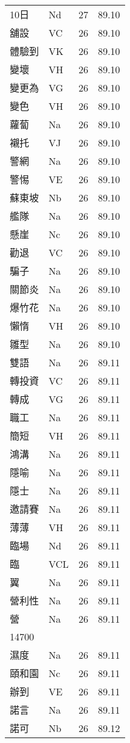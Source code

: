 \documentclass[twocolumn]{book}
\begin{document}
\begin{supertabular}{llrr}
10日 & Nd & 27 &  89.10\\
舖設 & VC & 26 &  89.10\\
體驗到 & VK & 26 &  89.10\\
變壞 & VH & 26 &  89.10\\
變更為 & VG & 26 &  89.10\\
變色 & VH & 26 &  89.10\\
蘿蔔 & Na & 26 &  89.10\\
襯托 & VJ & 26 &  89.10\\
警網 & Na & 26 &  89.10\\
警惕 & VE & 26 &  89.10\\
蘇東坡 & Nb & 26 &  89.10\\
艦隊 & Na & 26 &  89.10\\
懸崖 & Nc & 26 &  89.10\\
勸退 & VC & 26 &  89.10\\
騙子 & Na & 26 &  89.10\\
關節炎 & Na & 26 &  89.10\\
爆竹花 & Na & 26 &  89.10\\
懶惰 & VH & 26 &  89.10\\
雛型 & Na & 26 &  89.10\\
雙語 & Na & 26 &  89.11\\
轉投資 & VC & 26 &  89.11\\
轉成 & VG & 26 &  89.11\\
職工 & Na & 26 &  89.11\\
簡短 & VH & 26 &  89.11\\
鴻溝 & Na & 26 &  89.11\\
隱喻 & Na & 26 &  89.11\\
隱士 & Na & 26 &  89.11\\
邀請賽 & Na & 26 &  89.11\\
薄薄 & VH & 26 &  89.11\\
臨場 & Nd & 26 &  89.11\\
臨 & VCL & 26 &  89.11\\
翼 & Na & 26 &  89.11\\
營利性 & Na & 26 &  89.11\\
營 & Na & 26 &  89.11\\
14700\\
濕度 & Na & 26 &  89.11\\
頤和園 & Nc & 26 &  89.11\\
辦到 & VE & 26 &  89.11\\
諾言 & Na & 26 &  89.11\\
諾可 & Nb & 26 &  89.12\\

\end{supertabular}
\end{document}

